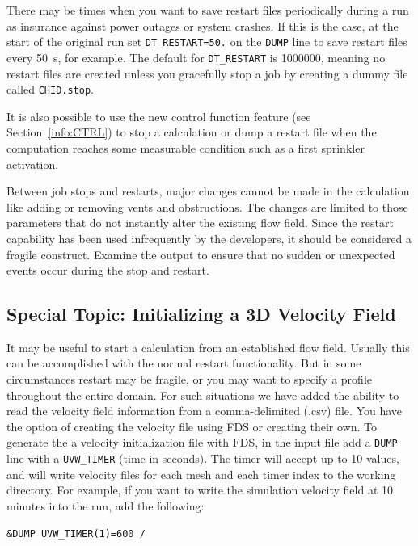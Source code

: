 \documentclass[11pt]{book}
\newcommand{\ct}{\tt\small}
\begin{document}
There may be times when you want to save restart files periodically
during a run as insurance against power outages or system crashes.
If this is the case, at the start of the original run
set {\ct DT\_RESTART=50.} on the {\ct DUMP} line to save restart files
every 50~s, for example.
The default for {\ct DT\_RESTART} is 1000000, meaning no restart files are
created unless you gracefully stop a job by
creating a dummy file called {\ct CHID.stop}.

It is also possible to use the new control function feature (see Section~\ref{info:CTRL})
to stop a calculation or dump a restart file when the computation reaches
some measurable condition such as a first sprinkler activation.

Between job stops and restarts, major changes cannot be made in the calculation
like adding or removing vents and obstructions. The changes are limited to those parameters that do
not instantly alter the existing flow field. Since the restart
capability has been used infrequently by the developers, it should be considered
a fragile construct. Examine the output
to ensure that no sudden or unexpected events occur during the stop and
restart.


\subsection{Special Topic: Initializing a 3D Velocity Field}
\label{info:velo_restart}
\label{info:CSVF}

It may be useful to start a calculation from an established flow field.  Usually this can be accomplished with the normal restart functionality.  But in some circumstances restart may be fragile, or you may want to specify a profile throughout the entire domain.  For such situations we have added the ability to read the velocity field information from a comma-delimited (.csv) file.  You have the option of creating the velocity file using FDS or creating their own.  To generate the a velocity initialization file with FDS, in the input file add a {\ct DUMP} line with a {\ct UVW\_TIMER} (time in seconds).  The timer will accept up to 10 values, and will write velocity files for each mesh and each timer index to the working directory.  For example, if you want to write the simulation velocity field at 10 minutes into the run, add the following:

\footnotesize
\begin{verbatim}
&DUMP UVW_TIMER(1)=600 /
\end{verbatim}
\normalsize
\end{document}
